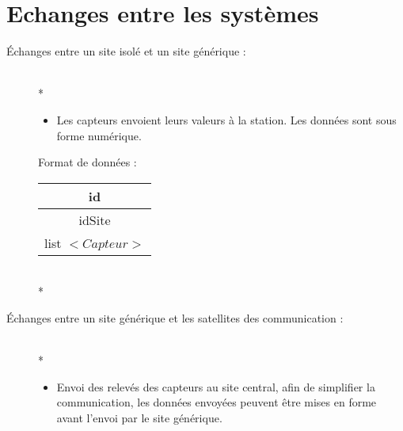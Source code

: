\section{Echanges entre les systèmes}


\begin{description}
\item[Échanges entre un site isolé et un site générique :]~\\*
	\begin{itemize}
		\item Les capteurs envoient leurs valeurs à la station. Les données sont sous forme numérique.
	\end{itemize}

	Format de données :		
	\begin{tabular}{|c|}
	\hline
	id\\
	\hline
	idSite\\
	\hline
	list $<Capteur>$\\
	\hline
	\end{tabular}
~\\*

\item[Échanges entre un site générique et les satellites des communication :]~\\*
	\begin{itemize}
		\item Envoi des relevés des capteurs au site central, afin de simplifier la communication, les données envoyées peuvent être mises en forme avant l'envoi par le 	site générique.
	\end{itemize}


\end{description}
